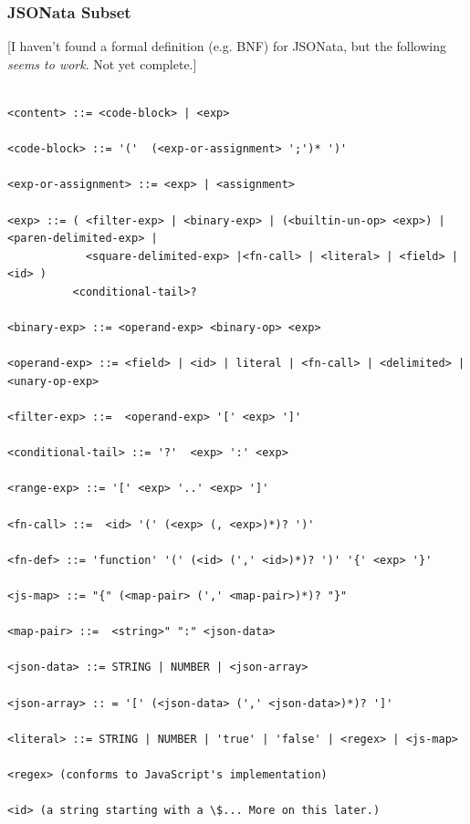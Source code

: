 \documentclass[9pt,letterpaper]{article}
\begin{document}
\subsubsection{JSONata Subset}
[I haven't found a formal definition (e.g. BNF) for JSONata, but the following \textit{seems to work}. Not yet complete.]

\begin{Verbatim}[fontsize=\footnotesize]

<content> ::= <code-block> | <exp>

<code-block> ::= '('  (<exp-or-assignment> ';')* ')'

<exp-or-assignment> ::= <exp> | <assignment>

<exp> ::= ( <filter-exp> | <binary-exp> | (<builtin-un-op> <exp>) | <paren-delimited-exp> |
            <square-delimited-exp> |<fn-call> | <literal> | <field> | <id> )
          <conditional-tail>?

<binary-exp> ::= <operand-exp> <binary-op> <exp>

<operand-exp> ::= <field> | <id> | literal | <fn-call> | <delimited> | <unary-op-exp>

<filter-exp> ::=  <operand-exp> '[' <exp> ']'

<conditional-tail> ::= '?'  <exp> ':' <exp>

<range-exp> ::= '[' <exp> '..' <exp> ']'

<fn-call> ::=  <id> '(' (<exp> (, <exp>)*)? ')'

<fn-def> ::= 'function' '(' (<id> (',' <id>)*)? ')' '{' <exp> '}'

<js-map> ::= "{" (<map-pair> (',' <map-pair>)*)? "}"

<map-pair> ::=  <string>" ":" <json-data>

<json-data> ::= STRING | NUMBER | <json-array>

<json-array> :: = '[' (<json-data> (',' <json-data>)*)? ']'

<literal> ::= STRING | NUMBER | 'true' | 'false' | <regex> | <js-map>

<regex> (conforms to JavaScript's implementation)

<id> (a string starting with a \$... More on this later.)

\end{Verbatim}
\end{document}
